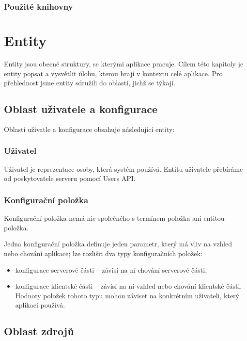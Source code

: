 \subsubsection{Použité knihovny}


\section{Entity}

Entity jsou obecné struktury, se kterými aplikace pracuje.
Cílem této kapitoly je entity popsat a vysvětlit úlohu, kterou hrají v kontextu celé aplikace.
Pro přehlednost jsme entity sdružili do oblastí, jichž se týkají.

\subsection{Oblast uživatele a konfigurace}

Oblasti uživatle a konfigurace obsahuje následující entity:

\subsubsection{Uživatel}

Uživatel je reprezentace osoby, která systém používá.
Entitu uživatele přebíráme od poskytovatele serveru pomocí Users API.

\subsubsection{Konfigurační položka}

Konfigurační položka nemá nic společného s termínem položka ani entitou položka.

Jedna konfigurační položka definuje jeden parametr, který má vliv na vzhled nebo chování aplikace; lze rozlišit dva typy konfiguračních položek:
\begin{itemize}
	\item konfigurace serverové části -- závisí na ní chování serverové části,
	\item konfigurace klientské části -- závisí na ní vzhled nebo chování klientské části.
		Hodnoty položek tohoto typu mohou záviset na konkrétním uživateli, který aplikaci používá.
\end{itemize}

\subsection{Oblast zdrojů}

